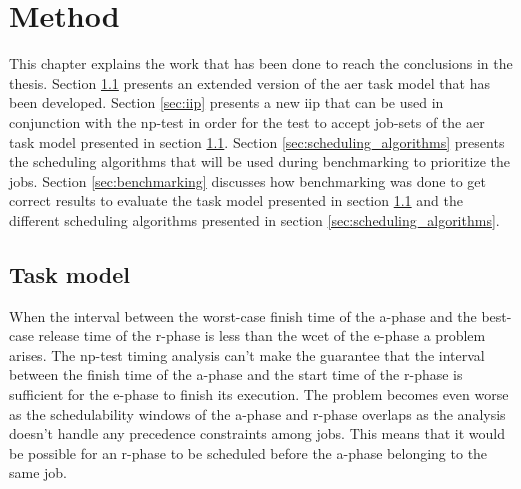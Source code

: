 \documentclass{kththesis}
\begin{document}
\chapter{Method} \label{ch:method}

This chapter explains the work that has been done to reach the conclusions in the thesis. Section
\ref{sec:work_task_model} presents an extended version of the \acrshort{aer} task model that has
been developed. Section \ref{sec:iip} presents a new \acrshort{iip} that can be used in conjunction
with the \acrshort{np}-test in order for the test to accept job-sets of the \acrshort{aer} task
model presented in section \ref{sec:work_task_model}. Section \ref{sec:scheduling_algorithms}
presents the scheduling algorithms that will be used during benchmarking to prioritize the jobs.
Section \ref{sec:benchmarking} discusses how benchmarking was done to get correct results to
evaluate the task model presented in section \ref{sec:work_task_model} and the different scheduling
algorithms presented in section \ref{sec:scheduling_algorithms}.

\section{Task model} \label{sec:work_task_model}

When the interval between the worst-case finish time of the \acrshort{a}-phase and the best-case
release time of the \acrshort{r}-phase is less than the \acrshort{wcet} of the \acrshort{e}-phase a
problem arises. The \acrshort{np}-test timing analysis can't make the guarantee that the interval
between the finish time of the \acrshort{a}-phase and the start time of the \acrshort{r}-phase is
sufficient for the \acrshort{e}-phase to finish its execution. The problem becomes even worse as the
schedulability windows of the \acrshort{a}-phase and \acrshort{r}-phase overlaps as the analysis
doesn't handle any precedence constraints among jobs. This means that it would be possible for an
\acrshort{r}-phase to be scheduled before the \acrshort{a}-phase belonging to the same job.
\end{document}
